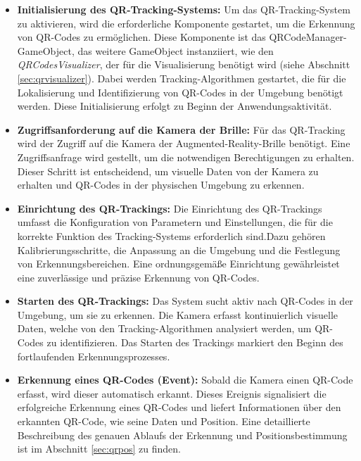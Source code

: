\begin{itemize}

\item \textbf{Initialisierung des QR-Tracking-Systems:}
Um das QR-Tracking-System zu aktivieren, wird die erforderliche Komponente gestartet, um die Erkennung von QR-Codes zu ermöglichen. Diese Komponente ist das QRCodeManager-GameObject, das weitere GameObject instanziiert, wie den \textit{QRCodesVisualizer}, der für die Visualisierung benötigt wird (siehe Abschnitt \ref{sec:qrvisualizer}). Dabei werden Tracking-Algorithmen gestartet, die für die Lokalisierung und Identifizierung von QR-Codes in der Umgebung benötigt werden. Diese Initialisierung erfolgt zu Beginn der Anwendungsaktivität.

\item \textbf{Zugriffsanforderung auf die Kamera der Brille:}
Für das QR-Tracking wird der Zugriff auf die Kamera der Augmented-Reality-Brille benötigt. Eine Zugriffsanfrage wird
gestellt, um die notwendigen Berechtigungen zu erhalten. Dieser Schritt ist entscheidend, um visuelle Daten von der Kamera
zu erhalten und QR-Codes in der physischen Umgebung zu erkennen.

\item \textbf{Einrichtung des QR-Trackings:}
Die Einrichtung des QR-Trackings umfasst die Konfiguration von Parametern und Einstellungen, die für die korrekte
Funktion des Tracking-Systems erforderlich sind.Dazu gehören Kalibrierungsschritte, die Anpassung an die Umgebung und die
Festlegung von Erkennungsbereichen. Eine ordnungsgemäße Einrichtung gewährleistet eine zuverlässige und präzise Erkennung von QR-Codes.

\item \textbf{Starten des QR-Trackings:}
Das System sucht aktiv nach QR-Codes in der Umgebung, um sie zu erkennen. Die Kamera erfasst kontinuierlich visuelle
Daten, welche von den Tracking-Algorithmen analysiert werden, um QR-Codes zu identifizieren. Das Starten des Trackings
markiert den Beginn des fortlaufenden Erkennungsprozesses.

\item \textbf{Erkennung eines QR-Codes (Event):}
Sobald die Kamera einen QR-Code erfasst, wird dieser automatisch erkannt. Dieses Ereignis signalisiert die erfolgreiche Erkennung eines QR-Codes und liefert Informationen über den erkannten QR-Code, wie seine Daten und Position. Eine detaillierte Beschreibung des genauen Ablaufs der Erkennung und Positionsbestimmung ist im Abschnitt \ref{sec:qrpos} zu finden.


\end{itemize}
